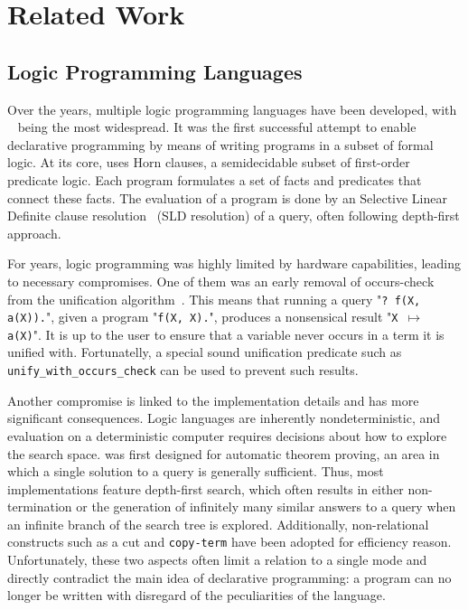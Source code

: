 \section{Related Work}

\subsection{Logic Programming Languages}

Over the years, multiple logic programming languages have been developed, with \prolog~\cite{battani1973interpreteur} being the most widespread. 
It was the first successful attempt to enable declarative programming by means of writing programs in a subset of formal logic.
At its core, \prolog uses Horn clauses, a semidecidable subset of first-order predicate logic. 
Each program formulates a set of facts and predicates that connect these facts. 
The evaluation of a program is done by an Selective Linear Definite clause resolution~\cite{robinson1965machine} (SLD resolution) of a query, often following depth-first approach.  

For years, logic programming was highly limited by hardware capabilities, leading to necessary compromises. 
One of them was an early removal of occurs-check from the unification algorithm~\cite{cohen1988view}. 
This means that running a query "\texttt{? f(X, a(X)).}", given a program "\texttt{f(X, X).}", produces a nonsensical result "\texttt{X $\mapsto$ a(X)}". 
It is up to the user to ensure that a variable never occurs in a term it is unified with. 
Fortunatelly, a special sound unification predicate such as \texttt{unify\_with\_occurs\_check} can be used to prevent such results. 

Another compromise is linked to the implementation details and has more significant consequences. 
Logic languages are inherently nondeterministic, and evaluation on a deterministic computer requires decisions about how to explore the search space. 
\prolog was first designed for automatic theorem proving, an area in which a single solution to a query is generally sufficient. 
Thus, most \prolog implementations feature depth-first search, which often results in either non-termination or the generation of infinitely many similar answers to a query when an infinite branch of the search tree is explored. 
Additionally, non-relational constructs such as a cut and \texttt{copy-term} have been adopted for efficiency reason. 
Unfortunately, these two aspects often limit a relation to a single mode and directly contradict the main idea of declarative programming: a program can no longer be written with disregard of the peculiarities of the language. 

